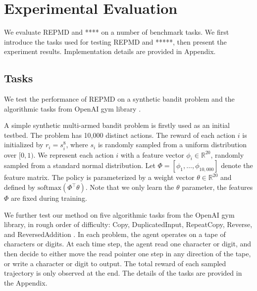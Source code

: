 
\section{Experimental Evaluation}
\label{sec:experiments}


We evaluate REPMD and **** on a number of benchmark tasks. We first introduce the tasks used for testing REPMD and *****, then present the experiment results. Implementation details are provided in Appendix. 

\subsection{Tasks}
\label{subsec:tasks}
We test the performance of REPMD on a synthetic bandit problem and the algorithmic tasks from OpenAI gym library \citep{brockman2016openai}.  

A simple synthetic multi-armed bandit problem is firstly used as an initial testbed.
The problem has 10,000 distinct actions. The reward of each action $i$ is initialized by $r_i = s_i^{8}$, where $s_i$ is randomly sampled from a uniform distribution over $[0,1)$. We represent each action $i$ with a feature vector $\phi_i\in \mathbb{R}^{20}$, randomly sampled from a standard normal distribution. Let $\Phi=[\phi_1,\dots,\phi_{10,000}]$ denote the feature matrix. The policy is parameterized by a weight vector $\theta\in  \mathbb{R}^{20}$ and  defined by $\text{softmax}(\Phi^{\top}\theta)$. Note that we only learn the $\theta$ parameter, the features $\Phi$ are fixed during training. 

We further test our method on five algorithmic tasks from the OpenAI gym library, in rough order of difficulty: Copy, DuplicatedInput, RepeatCopy, Reverse, and ReversedAddition \citep{brockman2016openai}. In each problem, the agent operates on a tape of characters or digits. At each time step, the agent read one character or digit, and then decide to either move the read pointer one step in any direction of the tape, or write a character or digit to output. The total reward of each sampled trajectory is only observed at the end. The details of the tasks are provided in the Appendix.

